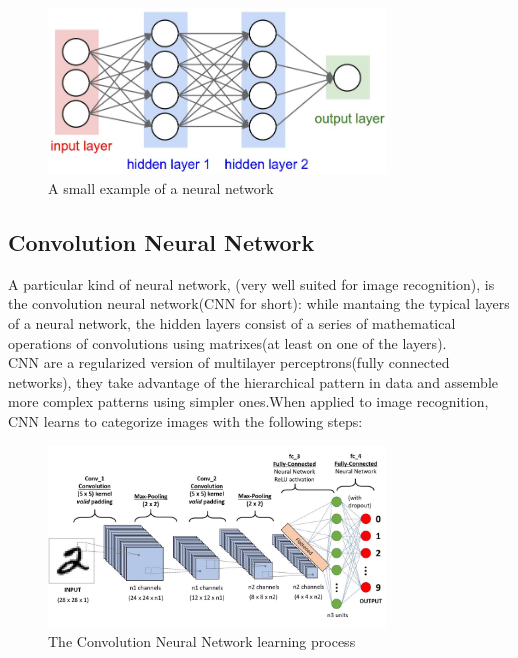 \documentclass{article}
\begin{document}
\begin{figure}[h] 
		\includegraphics[width=0.8\textwidth ]{images/neural.jpg}
		\centering
		\caption{A small example of a neural network}
\end{figure}
 
 \subsection{Convolution Neural Network}
 A particular kind of neural network, (very well suited for image recognition), is the convolution neural network(CNN for short): while mantaing the typical layers of a neural network, the hidden layers consist of a series of mathematical operations of convolutions using matrixes(at least on one of the layers).\\
CNN are a regularized version of multilayer perceptrons(fully connected networks), they take advantage of the hierarchical pattern in data and assemble more complex patterns using simpler ones.When applied to image recognition, CNN learns to categorize images with the following steps:\\

\begin{figure}[h] 
		\includegraphics[width=0.8\textwidth ]{images/convolution.jpeg}
		\centering
		\caption{The Convolution Neural Network learning process}
\end{figure}
\end{document}
